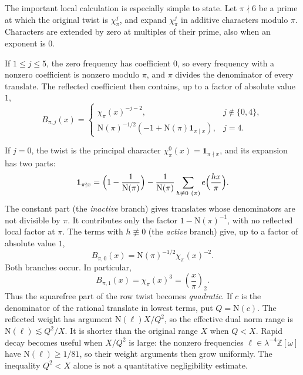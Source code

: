 \documentclass[11pt]{article}
\newcommand{\OO}{\mathbb Z[\omega]}
\newcommand{\N}{\mathrm N}
\newcommand{\ind}{\mathbf 1}
\numberwithin{equation}{section}
\begin{document}
The important local calculation is especially simple to state.
Let $\pi\nmid6$ be a prime at which the original twist is $\chi_\pi^j$, and expand
$\chi_\pi^j$ in additive characters modulo $\pi$. Characters are extended by
zero at multiples of their prime, also when an exponent is $0$.

If $1\le j\le5$, the zero frequency has coefficient $0$, so every frequency
with a nonzero coefficient is nonzero modulo $\pi$, and $\pi$ divides the
denominator of every translate. The reflected coefficient
then contains, up to a factor of absolute value $1$,
\begin{equation}\label{eq:Blocal}
 B_{\pi,j}(x)=
 \begin{cases}
  \chi_\pi(x)^{-j-2},&j\notin\{0,4\},\\
  \N(\pi)^{-1/2}(-1+\N(\pi)\ind_{\pi\mid x}),&j=4.
 \end{cases}
\end{equation}

If $j=0$, the twist is the principal character $\chi_\pi^0(x)=\ind_{\pi\nmid x}$, and its
expansion has two parts:
\begin{equation}\label{eq:jzero}
 \ind_{\pi\nmid x}=\Bigl(1-\frac1{\N(\pi)}\Bigr)
 -\frac1{\N(\pi)}\sum_{h\not\equiv0\ (\pi)}e\Bigl(\frac{hx}\pi\Bigr).
\end{equation}
The constant part (the \emph{inactive} branch) gives translates whose denominators
are not divisible by $\pi$. It contributes only the factor $1-\N(\pi)^{-1}$, with no
reflected local factor at $\pi$. The terms with $h\not\equiv0$ (the \emph{active}
branch) give, up to a factor of absolute value $1$,
\begin{equation}\label{eq:jzeroactive}
 B_{\pi,0}(x)=\N(\pi)^{-1/2}\chi_\pi(x)^{-2}.
\end{equation}
Both branches occur. In particular,
\begin{equation}\label{eq:Bone}
 B_{\pi,1}(x)=\chi_\pi(x)^3=\left(\frac x\pi\right)_2.
\end{equation}
Thus the squarefree part of the row twist becomes \emph{quadratic}.
If $c$ is the denominator of the rational translate in lowest terms, put
$Q=\N(c)$. The reflected weight has argument $\N(\ell)X/Q^2$, so the
effective dual norm range is $\N(\ell)\lesssim Q^2/X$. It is shorter
than the original range $X$ when $Q<X$. Rapid decay becomes useful when
$X/Q^2$ is large: the nonzero frequencies $\ell\in\lambda^{-4}\OO$ have $\N(\ell)\ge1/81$,
so their weight arguments then grow uniformly. The inequality $Q^2<X$
alone is not a quantitative negligibility estimate.
\end{document}
